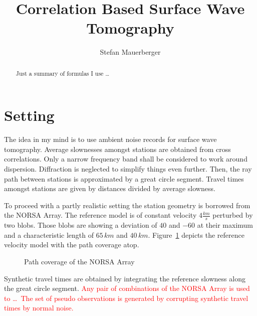 \documentclass[11pt]{article}
\title{Correlation Based Surface Wave Tomography}
\author{Stefan Mauerberger}
\newcommand\worries[1]{\textcolor{red}{#1}}
\begin{document}
\maketitle
\begin{abstract}
    Just a summary of formulas I use \dots
\end{abstract}

\section{Setting}

The idea in my mind is to use ambient noise records for surface wave tomography.
Average slownesses amongst stations are obtained from cross correlations.
Only a narrow frequency band shall be considered to work around dispersion.
Diffraction is neglected to simplify things even further.
Then, the ray path between stations is approximated by a great circle segment.
Travel times amongst stations are given by distances divided by average slowness.

To proceed with a partly realistic setting the station geometry is borrowed from the NORSA Array.
The reference model is of constant velocity $4\frac{km}s$ perturbed by two blobs.
Those blobs are showing a deviation of $40$ and $-60$ at their maximum and a characteristic length of $65\,km$ and $40\,km$.
Figure~\ref{fig:path_coverage} depicts the reference velocity model with the path coverage atop.

\begin{figure}
    \centering
    
    \caption{Path coverage of the NORSA Array}
    \label{fig:path_coverage}
\end{figure}

Synthetic travel times are obtained by integrating the reference slowness along the great circle segment.
\worries{Any pair of combinations of the NORSA Array is used to \dots\
The set of pseudo observations is generated by corrupting synthetic travel times by normal noise.}
\end{document}
